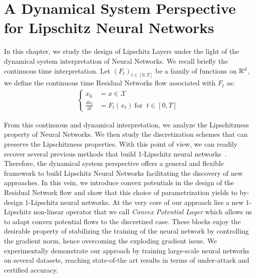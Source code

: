 \chapter{A Dynamical System Perspective for Lipschitz Neural Networks}
\minitoc
In this chapter, we study the design of Lipschitz Layers under the light of the dynamical system interpretation of Neural Networks. We recall briefly the continuous time interpretation.
Let $(F_{t})_{t\in[0,T]}$ be a family of functions on $\mathbb{R}^d$, we define the continuous time Residual Networks flow associated with $F_t$ as:
\begin{align*}
  \left\{
    \begin{array}{ll}
    x_0 &= x\in\mathcal{X}\\
    \frac{dx_{t}}{dt} &= F_{{t}}(x_{t}) \  \text{for } \ t\in[0, T]
  \end{array}
  \right.
\end{align*}

From this continuous and dynamical interpretation, we  analyze the Lipschitzness property of Neural Networks. We then study the discretization schemes that can preserve the Lipschitzness properties. With this point of view, we can readily recover several previous methods that build 1-Lipschitz neural networks~\citep{trockman2021orthogonalizing,skew2021sahil}.
Therefore, the dynamical system perspective offers a general and flexible framework to build Lipschitz Neural Networks facilitating the discovery of new approaches.
In this vein, we introduce convex potentials in the design of the Residual Network flow and show that this choice of parametrization yields to by-design $1$-Lipschitz neural networks.
At the very core of our approach lies a new $1$-Lipschitz non-linear operator that we call {\em Convex Potential Layer} which allows us to adapt convex potential flows to the discretized case. 
These blocks enjoy the desirable property of stabilizing the training of the neural network by controlling the gradient norm, hence overcoming the exploding gradient issue.
We experimentally demonstrate our approach by training large-scale neural networks on several datasets, reaching state-of-the art results in terms of under-attack and certified accuracy.

